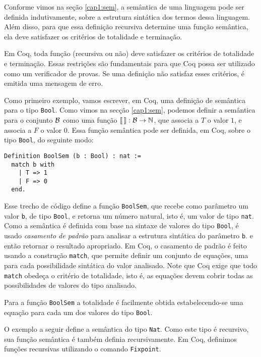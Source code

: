 Conforme vimos na se\c{c}\~ao \ref{cap1:sem}, a sem\^antica de uma linguagem pode ser definida indutivamente, sobre a estrutura sint\'atica dos termos dessa linguagem. Além disso, para que essa defini\c{c}\~ao recursiva determine uma fun\c{c}\~ao semântica, ela deve satisfazer os crit\'erios de totalidade e termina\c{c}\~ao.

Em Coq, toda fun\c{c}\~ao (recursiva ou n\~ao) deve satisfazer os crit\'erios de totalidade e termina\c{c}\~ao. Essas restri\c{c}\~oes s\~ao fundamentais para que Coq possa ser 
utilizado como um verificador de provas. Se uma defini\c{c}\~ao n\~ao satisfaz  esses crit\'erios, é emitida uma mensagem de erro. 

Como primeiro exemplo, vamos escrever, em Coq, uma definição de semântica para o tipo
\texttt{Bool}. Como vimos na sec\c{c}\~ao \ref{cap1:sem}, podemos definir a sem\^antica para o conjunto $\mathcal{B}$ como uma função $\llbracket\,\rrbracket : \mathcal{B} \rightarrow \mathbb{N}$, que associa a $T$ o valor $1$, e associa a $F$ o valor $0$.
Essa função semântica pode ser definida, em Coq, sobre o tipo \texttt{Bool}, do seguinte modo:
\begin{lstlisting}
Definition BoolSem (b : Bool) : nat :=
  match b with
    | T => 1
    | F => 0
  end.
\end{lstlisting}
Esse trecho de c\'odigo define a fun\c{c}\~ao \texttt{BoolSem}, que recebe
como par\^ametro um valor \texttt{b}, de tipo \texttt{Bool}, e
retorna um n\'umero natural, isto é, um valor de tipo \texttt{nat}. Como a
sem\^antica é definida com base na sintaxe de valores do tipo \texttt{Bool}, é usado \emph{casamento de padr\~ao\/} para analisar a estrutura sint\'atica do par\^ametro \texttt{b}.  e ent\~ao retornar o resultado apropriado. Em Coq, o casamento de padr\~ao \'e feito usando a constru\c{c}\~ao \texttt{match}, que permite definir um conjunto de equa\c{c}\~oes, uma para cada possibilidade sint\'atica do valor analisado. Note que Coq exige que todo \texttt{match} obede\c{c}a o crit\'erio de totalidade, isto é, as equa\c{c}\~oes devem cobrir todas as possibilidades de valores do tipo analisado.

Para a fun\c{c}\~ao \texttt{BoolSem} a totalidade \'e facilmente obtida estabelecendo-se uma equa\c{c}\~ao para cada um dos valores do tipo \texttt{Bool}.

O exemplo a seguir define a sem\^antica do tipo \texttt{Nat}. Como
este tipo \'e recursivo, sua fun\c{c}\~ao sem\^antica é tamb\'em definia recursivamente.
Em Coq, definimos fun\c{c}\~oes recursivas utilizando o comando \texttt{Fixpoint}.
 
